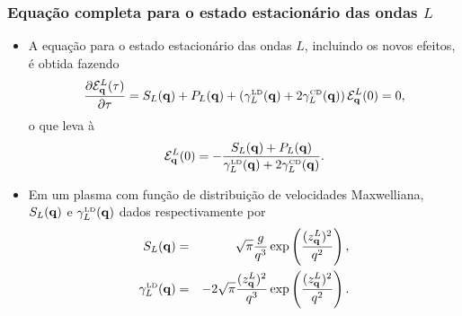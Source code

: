\documentclass[10pt,aspectratio=1610,lualatex]{beamer}
\begin{document}
\begin{frame}[noframenumbering]
  \frametitle{Equação completa para o estado estacionário das ondas $L$}
  \begin{itemize}
  \item   A equação para o estado estacionário das ondas $L$,
    incluindo os novos efeitos, é obtida fazendo 
  \begin{equation*}
    \frac{\partial {\cal E}_{\bf q}^L(\tau)}{\partial \tau}
    =S_L({\bf q})+P_L({\bf q}) +\left( \gamma_L^{\mbox{\tiny LD}}({\bf q})
      +2 \gamma_L^{\mbox{\tiny CD}}({\bf q})\right){\cal E}_{\bf q}^L(0)=0,
  \end{equation*}
  o que leva à
  \begin{equation*}
    {\cal E}_{\bf q}^L(0)
    =-\frac{S_L({\bf q})+P_L({\bf q})}
    {\gamma_L^{\mbox{\tiny LD}}({\bf q})+2 \gamma_L^{\mbox{\tiny CD}}({\bf q})}.
  \end{equation*}
  \item Em um plasma com função de distribuição de velocidades Maxwelliana,
  $S_L({\bf q})$ e $\gamma_L^{\mbox{\tiny LD}}({\bf q})$ dados respectivamente
  por
  \begin{eqnarray}
    S_L({\bf q})
    &=&\sqrt{\pi}\frac{g}{q^3}
        \exp \left(\frac{(z_{\bf q}^L)^2}{q^2}\right),
        \nonumber \\
    \gamma_L^{\mbox{\tiny LD}}({\bf q})
    &=&-2\sqrt{\pi}\frac{(z_{\bf q}^L)^2}{q^3}
        \exp \left(\frac{(z_{\bf q}^L)^2}{q^2} \right).
        \nonumber
  \end{eqnarray}
  \end{itemize}
\end{frame}
\end{document}
